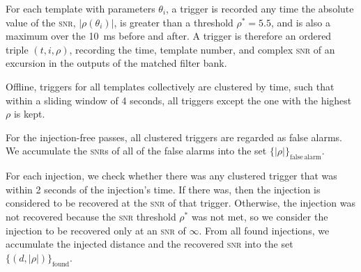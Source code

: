 For each template with parameters $\theta_i$, a trigger is recorded any time the absolute value of the \textsc{snr}, $|\rho(\theta_i)|$, is greater than a threshold $\rho^* = 5.5$, and is also a maximum over the 10~ms before and after.  A trigger is therefore an ordered triple $(t, i, \rho)$, recording the time, template number, and complex \textsc{snr} of an excursion in the outputs of the matched filter bank.

Offline, triggers for all templates collectively are clustered by time, such that within a sliding window of 4 seconds, all triggers except the one with the highest $\rho$ is kept.

For the injection-free passes, all clustered triggers are regarded as false alarms.  We accumulate the \textsc{snr}s of all of the false alarms into the set $\{|\rho|\}_\mathrm{false\,alarm}$.

For each injection, we check whether there was any clustered trigger that was within 2 seconds of the injection's time.  If there was, then the injection is considered to be recovered at the \textsc{snr} of that trigger.  Otherwise, the injection was not recovered because the \textsc{snr} threshold $\rho^*$ was not met, so we consider the injection to be recovered only at an \textsc{snr} of $\infty$.  From all found injections, we accumulate the injected distance and the recovered \textsc{snr} into the set $\{(d, |\rho|)\}_\mathrm{found}$.


